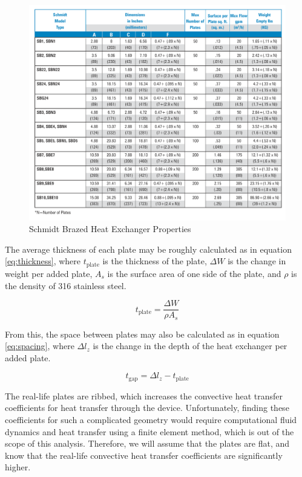 \documentclass[12pt,letterpaper]{article}
\begin{document}
\begin{figure}[t]
\center
\label{tab:schmidt}
\includegraphics[width=5.0in]{schmidt_props.png}
\caption{Schmidt Brazed Heat Exchanger Properties}
\end{figure}

The average thickness of each plate may be roughly calculated as in equation \ref{eq:thickness}, where \(t_{\textrm{plate}}\) is the thickness of the plate, \(\Delta W\) is the change in weight per added plate, \(A_s\) is the surface area of one side of the plate, and \(\rho\) is the density of 316 stainless steel.

\begin{equation}
\label{eq:thickness}
t_{\textrm{plate}} = \frac{\Delta W}{\rho A_s}
\end{equation}

From this, the space between plates may also be calculated as in equation \ref{eq:spacing}, where \(\Delta l_z\) is the change in the depth of the heat exchanger per added plate.

\begin{equation}
\label{eq:spacing}
t_{\textrm{gap}} = \Delta l_z - t_{\textrm{plate}}
\end{equation}

The real-life plates are ribbed, which increases the convective heat transfer coefficients for heat transfer through the device. Unfortunately, finding these coefficients for such a complicated geometry would require computational fluid dynamics and heat transfer using a finite element method, which is out of the scope of this analysis.  Therefore, we will assume that the plates are flat, and know that the real-life convective heat transfer coefficients are significantly higher.
\end{document}
